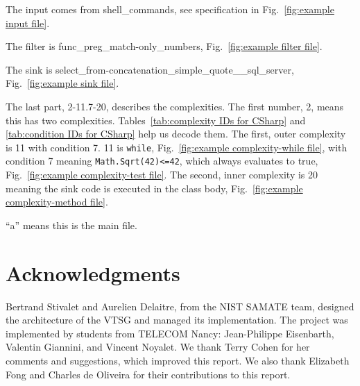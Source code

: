 \documentclass[12pt]{article}
\begin{document}
\noindent The input comes from shell\_commands, see specification in
Fig.~\ref{fig:example input file}.

\noindent The filter is func\_preg\_match-only\_numbers,
Fig.~\ref{fig:example filter file}.

\noindent The sink is select\_from-concatenation\_simple\_quote\_\_sql\_server,
Fig.~\ref{fig:example sink file}.

\noindent The last part, 2-11.7-20, describes the complexities.
The first number, 2, means this has two complexities.
Tables~\ref{tab:complexity IDs for CSharp} and
\ref{tab:condition IDs for CSharp} help us decode them.
The first, outer complexity is 11 with condition 7. 11 is \verb|while|,
Fig.~\ref{fig:example complexity-while file}, 
with condition 7 meaning \verb|Math.Sqrt(42)<=42|, which always evaluates to true,
Fig.~\ref{fig:example complexity-test file}.
The second, inner complexity is 20 meaning the sink code is executed in the class body,
Fig.~\ref{fig:example complexity-method file}.

\noindent ``a'' means this is the main file.



\section{Acknowledgments}

Bertrand Stivalet and Aurelien Delaitre, from the NIST SAMATE team, designed the
architecture of the VTSG and managed its implementation.  The project was
implemented by students from TELECOM Nancy: Jean-Philippe Eisenbarth, Valentin
Giannini, and Vincent Noyalet.  We thank Terry Cohen for her comments and
suggestions, which improved this report.  We also thank Elizabeth Fong and
Charles de Oliveira for their contributions to this report.
%
%
%
%
\end{document}

